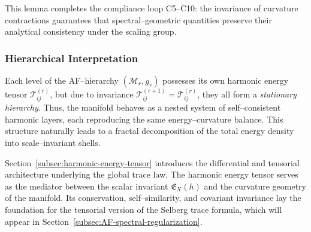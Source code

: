 \begin{remark}
This lemma completes the compliance loop C5–C10:
the invariance of curvature contractions guarantees
that spectral–geometric quantities preserve
their analytical consistency under the scaling group.
\end{remark}


\subsubsection*{Hierarchical Interpretation}
Each level of the AF–hierarchy \((\mathcal{M}_r, g_r)\)
possesses its own harmonic energy tensor \(\mathcal{T}_{ij}^{(r)}\),
but due to invariance \(\mathcal{T}_{ij}^{(r+1)}=\mathcal{T}_{ij}^{(r)}\),
they all form a \emph{stationary hierarchy}.
Thus, the manifold behaves as a nested system
of self–consistent harmonic layers,
each reproducing the same energy–curvature balance.
This structure naturally leads to a fractal decomposition
of the total energy density into scale–invariant shells.


\begin{remark}
Section~\ref{subsec:harmonic-energy-tensor} introduces
the differential and tensorial architecture underlying the global trace law.
The harmonic energy tensor serves as the mediator
between the scalar invariant \(\mathfrak{E}_X(h)\)
and the curvature geometry of the manifold.
Its conservation, self–similarity, and covariant invariance
lay the foundation for the tensorial version of the Selberg trace formula,
which will appear in Section~\ref{subsec:AF-spectral-regularization}.
\end{remark}


